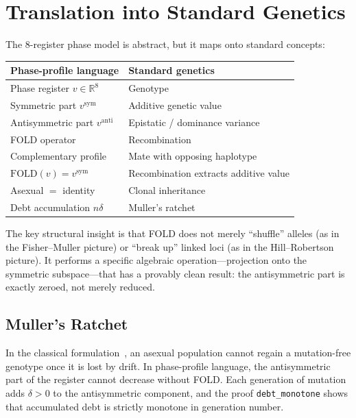 \documentclass[11pt,twocolumn]{article}
\begin{document}
\section{Translation into Standard Genetics}

The 8-register phase model is abstract, but it maps onto standard
concepts:

\begin{center}
\small
\begin{tabular}{@{}ll@{}}
\toprule
Phase-profile language & Standard genetics \\
\midrule
Phase register $v \in \mathbb{R}^8$ & Genotype \\
Symmetric part $v^{\mathrm{sym}}$ & Additive genetic value \\
Antisymmetric part $v^{\mathrm{anti}}$ & Epistatic / dominance variance \\
FOLD operator & Recombination \\
Complementary profile & Mate with opposing haplotype \\
$\mathrm{FOLD}(v) = v^{\mathrm{sym}}$ & Recombination extracts additive value \\
Asexual $=$ identity & Clonal inheritance \\
Debt accumulation $n\delta$ & Muller's ratchet \\
\bottomrule
\end{tabular}
\end{center}

The key structural insight is that FOLD does not merely ``shuffle''
alleles (as in the Fisher--Muller picture) or ``break up'' linked loci
(as in the Hill--Robertson picture). It performs a specific algebraic
operation---projection onto the symmetric subspace---that has a provably
clean result: the antisymmetric part is exactly zeroed, not merely
reduced.

\subsection{Muller's Ratchet}

In the classical formulation~\cite{Muller1964}, an asexual population
cannot regain a mutation-free genotype once it is lost by drift. In
phase-profile language, the antisymmetric part of the register cannot
decrease without FOLD. Each generation of mutation adds $\delta > 0$ to
the antisymmetric component, and the proof \texttt{debt\_monotone} shows
that accumulated debt is strictly monotone in generation number.
\end{document}
